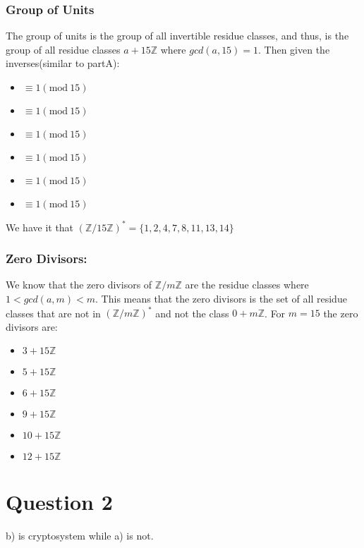 \documentclass{article}
\numberwithin{equation}{subsection}
\begin{document}
	\subsubsection*{Group of Units}
	The group of units is the group of all invertible residue classes, and thus, is the 
	group of all residue classes $a+15\mathbb{Z}$ where $gcd(a,15)=1$. Then given the inverses(similar to partA):
	
	\begin{itemize}
		\item{}  $\equiv 1(\textrm{mod}\ 15)$	
		\item{}  $\equiv 1(\textrm{mod}\ 15)$	
		\item{}  $\equiv 1(\textrm{mod}\ 15)$	
		\item{}  $\equiv 1(\textrm{mod}\ 15)$	
		\item{}  $\equiv 1(\textrm{mod}\ 15)$	
		\item{}  $\equiv 1(\textrm{mod}\ 15)$	
	\end{itemize}

	\vspace{1pt}
	We have it that $(\mathbb{Z}/15\mathbb{Z})^* = \{1,2,4,7,8,11,13,14\}$
	
	\vspace{10pt}
	\subsubsection*{Zero Divisors:}
	We know that the zero divisors of $\mathbb{Z}/m\mathbb{Z}$ are the residue
	classes where $1<gcd(a,m)<m$. This means that the zero divisors is the set of all
	residue classes that are not in $(\mathbb{Z}/m\mathbb{Z})^*$ and not the class $0+m\mathbb{Z}$.
	For $m=15$ the zero divisors are:
	
	\begin{itemize}
		\item $3+15\mathbb{Z}$	
		\item $5+15\mathbb{Z}$	
		\item $6+15\mathbb{Z}$	
		\item $9+15\mathbb{Z}$	
		\item $10+15\mathbb{Z}$	
		\item $12+15\mathbb{Z}$	
	\end{itemize}

	\newpage
	\section*{Question 2}
	b) is cryptosystem while a) is not.
\end{document}
